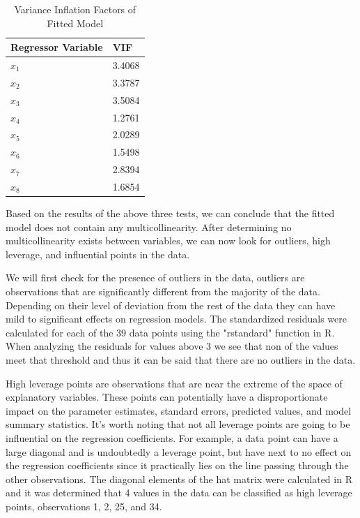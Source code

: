 \documentclass[12pt]{report}
\begin{document}
\begin{table}[H]
\caption{Variance Inflation Factors of Fitted Model} \label{tab:DC1}
\medskip
\centering
\begin{tabular}{|l|l|}
\hline
Regressor Variable & VIF    \\ \hline
$x_{1}$            & 3.4068 \\ \hline
$x_{2}$            & 3.3787 \\ \hline
$x_{3}$            & 3.5084 \\ \hline
$x_{4}$            & 1.2761 \\ \hline
$x_{5}$            & 2.0289 \\ \hline
$x_{6}$            & 1.5498 \\ \hline
$x_{7}$            & 2.8394 \\ \hline
$x_{8}$            & 1.6854 \\ \hline
\end{tabular}
\end{table}

Based on the results of the above three tests, we can conclude that the fitted model does not contain any multicollinearity. After determining no multicollinearity exists between variables, we can now look for outliers, high leverage, and influential points in the data.

 We will first check for the presence of outliers in the data, outliers are observations that are significantly different from the majority of the data. Depending on their level of deviation from the rest of the data they can have mild to significant effects on regression models. The standardized residuals were calculated for each of the 39 data points using the "rstandard" function in R. When analyzing the residuals for values above 3 we see that non of the values meet that threshold and thus it can be said that there are no outliers in the data. 

High leverage points are observations that are near the extreme of the space of explanatory variables. These points can potentially have a disproportionate impact on the parameter estimates, standard errors, predicted values, and model summary statistics. It's worth noting that not all leverage points are going to be influential on the regression coefficients. For example, a data point can have a large diagonal and is undoubtedly a leverage point, but have next to no effect on the regression coefficients since it practically lies on the line passing through the other observations. The diagonal elements of the hat matrix were calculated in R and it was determined that 4 values in the data can be classified as high leverage points, observations 1, 2, 25, and 34. 
\end{document}
